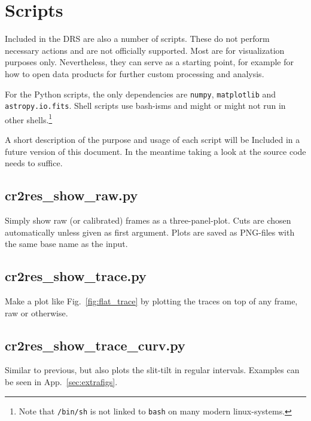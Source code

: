 \section{Scripts}
\label{sec:scripts}

Included in the DRS are also a number of scripts. These do not perform necessary
actions and are not officially supported. Most are for visualization purposes
only. Nevertheless, they can serve as a starting point, for example for how to
open data products for further custom processing and analysis.

For the Python scripts, the only dependencies are \texttt{numpy}, \texttt{matplotlib} and \texttt{astropy.io.fits}. Shell scripts use bash-isms and might
or might not run in other shells.\footnote{Note that \texttt{/bin/sh} is not linked to \texttt{bash} on many modern linux-systems.}

A short description of the purpose and usage of each script will be Included
in a future version of this document. In the meantime taking a look at the source code needs to suffice.


\subsection{cr2res\_show\_raw.py}
Simply show raw (or calibrated) frames as a three-panel-plot. Cuts are chosen automatically unless given as first argument. Plots are saved as PNG-files with the same base name as the input.
\begin{shell}
\end{shell}

\subsection{cr2res\_show\_trace.py}
Make a plot like Fig.~\ref{fig:flat_trace} by plotting the traces on top of any
frame, raw or otherwise.

\subsection{cr2res\_show\_trace\_curv.py}
Similar to previous, but also plots the slit-tilt in regular intervals. Examples can be seen in App.~\ref{sec:extrafigs}.

